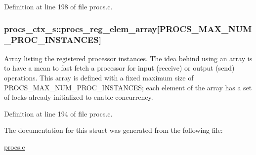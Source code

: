 Definition at line 198 of file procs.\+c.

\subsubsection[{\texorpdfstring{procs\+\_\+reg\+\_\+elem\+\_\+array}{procs_reg_elem_array}}]{ procs\+\_\+ctx\+\_\+s\+::procs\+\_\+reg\+\_\+elem\+\_\+array\mbox{[}{\bf P\+R\+O\+C\+S\+\_\+\+M\+A\+X\+\_\+\+N\+U\+M\+\_\+\+P\+R\+O\+C\+\_\+\+I\+N\+S\+T\+A\+N\+C\+ES}\mbox{]}}\hypertarget{structprocs__ctx__s_a08985565adf1f547b44b58addd85cbbe}{}\label{structprocs__ctx__s_a08985565adf1f547b44b58addd85cbbe}
Array listing the registered processor instances. The idea behind using an array is to have a mean to fast fetch a processor for input (receive) or output (send) operations. This array is defined with a fixed maximum size of P\+R\+O\+C\+S\+\_\+\+M\+A\+X\+\_\+\+N\+U\+M\+\_\+\+P\+R\+O\+C\+\_\+\+I\+N\+S\+T\+A\+N\+C\+ES; each element of the array has a set of locks already initialized to enable concurrency. 

Definition at line 194 of file procs.\+c.



The documentation for this struct was generated from the following file\+:\begin{DoxyCompactItemize}
\item 
\hyperlink{procs_8c}{procs.\+c}\end{DoxyCompactItemize}
